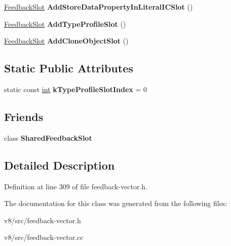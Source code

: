 \begin{DoxyCompactItemize}
\mbox{\hyperlink{classv8_1_1internal_1_1FeedbackSlot}{Feedback\+Slot}} {\bfseries Add\+Store\+Data\+Property\+In\+Literal\+I\+C\+Slot} ()
\item 
\mbox{\label{classv8_1_1internal_1_1FeedbackVectorSpec_ac3685ccd4743aa7ef877e05caec7e25e}} 
\mbox{\hyperlink{classv8_1_1internal_1_1FeedbackSlot}{Feedback\+Slot}} {\bfseries Add\+Type\+Profile\+Slot} ()
\item 
\mbox{\label{classv8_1_1internal_1_1FeedbackVectorSpec_a1edd281285368d00c1e0fd5a04ae14a8}} 
\mbox{\hyperlink{classv8_1_1internal_1_1FeedbackSlot}{Feedback\+Slot}} {\bfseries Add\+Clone\+Object\+Slot} ()
\end{DoxyCompactItemize}
\subsection*{Static Public Attributes}
\begin{DoxyCompactItemize}
\item 
\mbox{\label{classv8_1_1internal_1_1FeedbackVectorSpec_ab40d188996d64f70d4decbbb49669f19}} 
static const \mbox{\hyperlink{classint}{int}} {\bfseries k\+Type\+Profile\+Slot\+Index} = 0
\end{DoxyCompactItemize}
\subsection*{Friends}
\begin{DoxyCompactItemize}
\item 
\mbox{\label{classv8_1_1internal_1_1FeedbackVectorSpec_a447ef19d3be65fe9028003377eeb35a6}} 
class {\bfseries Shared\+Feedback\+Slot}
\end{DoxyCompactItemize}


\subsection{Detailed Description}


Definition at line 309 of file feedback-\/vector.\+h.



The documentation for this class was generated from the following files\+:\begin{DoxyCompactItemize}
\item 
v8/src/feedback-\/vector.\+h\item 
v8/src/feedback-\/vector.\+cc\end{DoxyCompactItemize}
